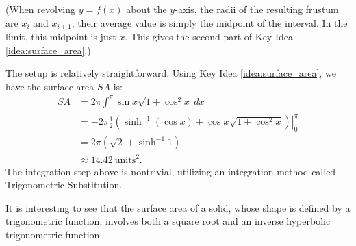 \documentclass{ximera}
\begin{document}
(When revolving $y=f(x)$ about the $y$-axis, the radii of the resulting frustum are $x_i$ and $x_{i+1}$; their average value is simply the midpoint of the interval. In the limit, this midpoint is just $x$. This gives the second part of Key Idea \ref{idea:surface_area}.)\\

{The setup is relatively straightforward. Using Key Idea \ref{idea:surface_area}, we have the surface area $SA$ is:
\begin{align*}
SA  &=	2\pi\int_0^\pi \sin x\sqrt{1+\cos^2x}\ dx \\
		&=	-2\pi\frac12\left.\left(\sinh^{-1}(\cos x)+\cos x\sqrt{1+\cos^2x}\right)\right|_0^\pi \\
		&= 2\pi\left(\sqrt{2}+\sinh^{-1} 1\right) \\
		&\approx 14.42\ \text{units}^2.
\end{align*}
The integration step above is nontrivial, utilizing an integration method called Trigonometric Substitution. 

It is interesting to see that the surface area of a solid, whose shape is defined by a trigonometric function, involves both a square root and an inverse hyperbolic trigonometric function.
}\\
\end{document}

